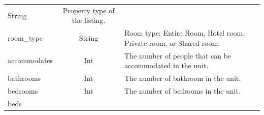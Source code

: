 \documentclass[
]{article}
\begin{document}
\begin{longtable}[]{@{}lcl@{}}
\begin{minipage}[t]{0.22\columnwidth}
String\strut
\end{minipage} & \begin{minipage}[t]{0.53\columnwidth}\raggedright
Property type of the listing.\strut
\end{minipage}\tabularnewline
\begin{minipage}[t]{0.17\columnwidth}\raggedright
room\_type\strut
\end{minipage} & \begin{minipage}[t]{0.22\columnwidth}\centering
String\strut
\end{minipage} & \begin{minipage}[t]{0.53\columnwidth}\raggedright
Room type: Entire Room, Hotel room, Private room, or Shared room.\strut
\end{minipage}\tabularnewline
\begin{minipage}[t]{0.17\columnwidth}\raggedright
accommodates\strut
\end{minipage} & \begin{minipage}[t]{0.22\columnwidth}\centering
Int\strut
\end{minipage} & \begin{minipage}[t]{0.53\columnwidth}\raggedright
The number of people that can be accommodated in the unit.\strut
\end{minipage}\tabularnewline
\begin{minipage}[t]{0.17\columnwidth}\raggedright
bathrooms\strut
\end{minipage} & \begin{minipage}[t]{0.22\columnwidth}\centering
Int\strut
\end{minipage} & \begin{minipage}[t]{0.53\columnwidth}\raggedright
The number of bathroom in the unit.\strut
\end{minipage}\tabularnewline
\begin{minipage}[t]{0.17\columnwidth}\raggedright
bedrooms\strut
\end{minipage} & \begin{minipage}[t]{0.22\columnwidth}\centering
Int\strut
\end{minipage} & \begin{minipage}[t]{0.53\columnwidth}\raggedright
The number of bedrooms in the unit.\strut
\end{minipage}\tabularnewline
\begin{minipage}[t]{0.17\columnwidth}\raggedright
beds\strut
\end{minipage} & \begin{minipage}[t]{0.22\columnwidth}\centering

\end{minipage}
\end{longtable}
\end{document}
